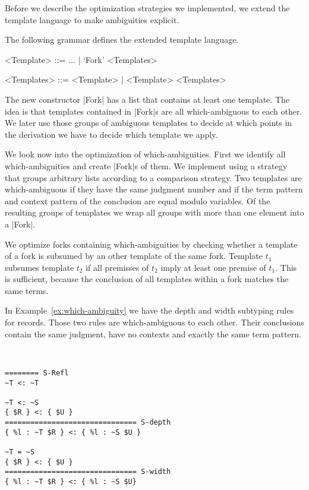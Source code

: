 Before we describe the optimization strategies we implemented, we
extend the template language to make ambiguities explicit.

\begin{definition}
    The following grammar defines the extended template language.
    \begin{grammar}
    <Template> ::= $\dots$ | `Fork' <Templates>

    <Templates> ::= <Template> | <Template> <Templates>
    \end{grammar}
\end{definition}

The new constructor \code|Fork| has a list that contains at least one
template. The idea is that templates contained in \code|Fork|s are all
which-ambiguous to each other. We later use those groups of ambiguous
templates to decide at which points in the derivation we have to
decide which template we apply.

We look now into the optimization of which-ambiguities. First we
identify all which-ambiguities and create \code|Fork|s of them. We
implement using a strategy that groups arbitrary lists according to a
comparison strategy. Two templates are which-ambiguous if they have
the same judgment number and if the term pattern and context pattern
of the conclusion are equal modulo variables. Of the resulting groups
of templates we wrap all groups with more than one element into a
\code|Fork|.

We optimize forks containing which-ambiguities by checking whether a
template of a fork is subsumed by an other template of the same
fork. Template $t_1$ subsumes template $t_2$ if all premisses of $t_2$
imply at least one premise of $t_1$. This is sufficient, because the
conclusion of all templates within a fork matches the same terms.

In Example~\ref{ex:which-ambiguity} we have the depth and width
subtyping rules for records. Those two rules are which-ambiguous to
each other. Their conclusions contain the same judgment, have no
contexts and exactly the same term pattern.

\begin{example}{~}
\begin{lstlisting}[language=sltc]
======== S-Refl
~T <: ~T

~T <: ~S
{ $R } <: { $U }
=============================== S-depth
{ %l : ~T $R } <: { %l : ~S $U }

~T = ~S
{ $R } <: { $U }
=============================== S-width
{ %l : ~T $R } <: { %l : ~S $U}
\end{lstlisting}
\label{ex:which-ambiguity}
\end{example}

